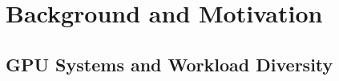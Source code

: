 \section{Background and Motivation}
\label{sec:background}
\subsection{GPU Systems and Workload Diversity}
\label{sec:arch-gpu}

